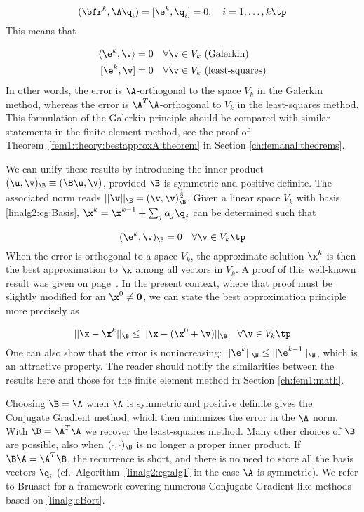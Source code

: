 \begin{equation}
(\bfr^k,\A\q_i) = [\e^k,\q_i] =0,\quad i=1,\ldots,k\tp
\end{equation}
This means that

\begin{align*}
\langle \e^k,\v\rangle  &= 0\quad\forall\v\in V_k\hbox{ (Galerkin)}\\
\lbrack \e^k,\v \rbrack  &= 0\quad\forall\v\in V_k\hbox{ (least-squares)}
\end{align*}
In other words, the error is $\A$-orthogonal
to the space $V_k$ in the Galerkin method, whereas the error is
$\A^T\A$-orthogonal to $V_k$ in the least-squares method.
This formulation of the Galerkin principle should be compared with
similar statements in the finite element method, see
the proof of Theorem~\ref{fem1:theory:bestapproxA:theorem} in
Section \ref{ch:femanal:theorems}.


We can unify these results by introducing the inner product
$ (\u,\v )_{\B} \equiv (\B\u,\v )$, provided $\B$ is symmetric and
positive definite. The associated norm reads
$||\v||_{\B}=(\v,\v )_{\B}^{1\over2}$.
 Given a linear space $V_k$ with basis
\eqref{linalg2:cg:Basis}, $\x^k = \x^{k-1}+\sum_j\alpha_j\q_j$
can be determined such that

\begin{equation}
(\e^k,\v )_{\B} =0\quad\forall\v\in V_k\tp
\label{linalg:eBort}
\end{equation}
When the error is orthogonal to a space $V_k$, the approximate solution
$\x^k$ is then the best approximation to $\x$ among all vectors
in $V_k$. A proof of this well-known result was given on
page~\pageref{fem1:theory:bestapproxA2}.
In the present context, where that proof must be slightly modified
for an $\x^0\neq {\bf 0}$, we can state the best approximation
principle more precisely as \cite{BruBok}

\begin{equation}
||\x - \x^k||_{\B} \leq ||\x - (\x^0 + \v )||_{\B}\quad\forall\v\in V_k\tp
\end{equation}
One can also show that the error is nonincreasing: $||\e^k||_{\B}
\leq ||\e^{k-1}||_{\B}$, which is an attractive property.
The reader should notify the similarities between the results here
and those for the finite element method in Section \ref{ch:fem1:math}.

Choosing $\B =\A$ when $\A$ is symmetric and positive definite gives
the Conjugate Gradient method, which then minimizes the error in the
$\A$ norm. With $\B =\A^T\A$ we recover the least-squares method.
Many other choices of $\B$ are possible, also when
$(\cdot,\cdot )_{\B}$ is no longer a proper inner product. If
$\B\A = \A^T\B$, the recurrence is short, and there is no need to
store all the basis vectors $\q_i$
(cf.~Algorithm~\ref{linalg2:cg:alg1} in the case $\A$ is symmetric).
We refer to Bruaset \cite{BruBok} for a framework covering numerous
Conjugate Gradient-like methods based on \eqref{linalg:eBort}.

